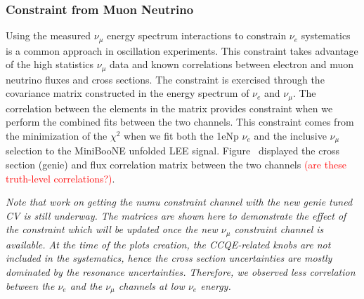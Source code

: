 \documentclass[a4paper]{article}
\begin{document}
\subsubsection{Constraint from Muon Neutrino}
\label{subsec:constraintfromnumu}
Using the measured $\nu_{\mu}$ energy spectrum interactions to constrain $\nu_e$ systematics is a common approach in oscillation experiments. 
This constraint takes advantage of the high statistics $\nu_{\mu}$ data and known correlations between electron and muon neutrino fluxes and cross sections. 
The constraint is exercised through the covariance matrix constructed in the energy spectrum of $\nu_e$ and $\nu_{\mu}$. 
The correlation between the elements in the matrix provides constraint when we perform the combined fits between the two channels. 
This constraint comes from the minimization of the $\chi^2$ when we fit both the 1eNp $\nu_e$ and the inclusive $\nu_{\mu}$ selection to the MiniBooNE unfolded LEE signal. 
Figure~\cite{fig:numuconstraint} displayed the cross section (genie) and flux correlation matrix between the two channels \textcolor{red}{(are these truth-level correlations?)}. 

\textit{Note that work on getting the numu constraint channel with the new genie tuned CV is still underway. 
The matrices are shown here to demonstrate the effect of the constraint which will be updated once the new $\nu_{\mu}$ constraint channel is available. 
At the time of the plots creation, the CCQE-related knobs are not included in the systematics, hence the cross section uncertainties are mostly dominated by the resonance uncertainties. 
Therefore, we observed less correlation between the $\nu_e$ and the $\nu_{\mu}$ channels at low $\nu_e$ energy.}
\end{document}

